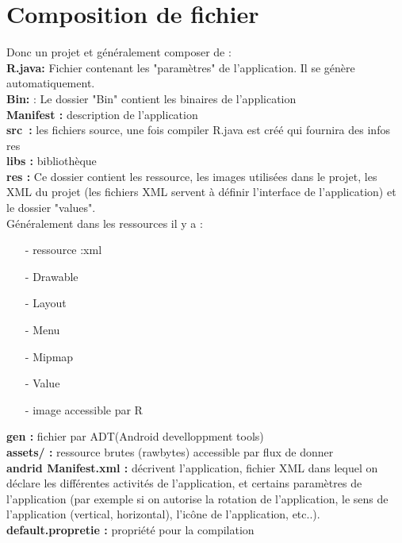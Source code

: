 \section{Composition de fichier}
Donc un projet et généralement composer de :\\
\textbf{R.java:} Fichier contenant les "paramètres" de l'application. Il se génère automatiquement.\\
\textbf{Bin:} : Le dossier "Bin" contient les binaires de l'application \\
\textbf{Manifest :} description de l’application\\
\textbf{src\ :}  les fichiers source, une fois compiler  R.java est créé qui fournira des infos res\\
\textbf{libs :} bibliothèque\\
\textbf{res :} Ce dossier contient les ressource, les images utilisées dans le projet, les XML du projet (les fichiers XML servent à définir l'interface de l'application) et le dossier "values".\\
Généralement dans les ressources il y a :
\begin{itemize}
\item[-]ressource :xml
\item[-]Drawable
\item[-]Layout
\item[-]Menu
\item[-]Mipmap
\item[-]Value
\item[-]image accessible par R
\end{itemize}
\textbf{gen :} fichier par ADT(Android develloppment tools)\\
\textbf{assets/ :} ressource brutes (rawbytes) accessible par flux de donner \\
\textbf{andrid Manifest.xml :} décrivent l’application, fichier XML dans lequel on déclare les différentes activités de l'application, et certains paramètres de l'application (par exemple si on autorise la rotation de l'application, le sens de l'application (vertical, horizontal), l'icône de l'application, etc..).\\
\textbf{default.propretie :} propriété pour la compilation \\
